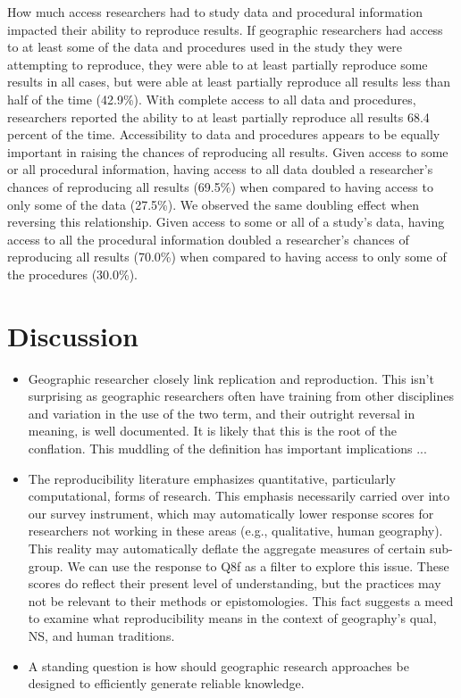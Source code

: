 \documentclass[]{interact}
\theoremstyle{plain}%
\theoremstyle{definition}
\theoremstyle{remark}
\begin{document}
How much access researchers had to study data and procedural information impacted their ability to reproduce results. 
If geographic researchers had access to at least some of the data and procedures used in the study they were attempting to reproduce, they were able to at least partially reproduce some results in all cases, but were able at least partially reproduce all results less than half of the time (42.9\%).
With complete access to all data and procedures, researchers reported the ability to at least partially reproduce all results 68.4 percent of the time.
Accessibility to data and procedures appears to be equally important in raising the chances of reproducing all results. 
Given access to some or all procedural information, having access to all data doubled a researcher's chances of reproducing all results (69.5\%) when compared to having access to only some of the data (27.5\%). 
We observed the same doubling effect when reversing this relationship. 
Given access to some or all of a study's data, having access to all the procedural information doubled a researcher's chances of reproducing all results (70.0\%) when compared to having access to only some of the procedures (30.0\%).


\section*{Discussion}

\begin{itemize}
    \item Geographic researcher closely link replication and reproduction. This isn't surprising as geographic researchers often have training from other disciplines and variation in the use of the two term, and their outright reversal in meaning, is well documented. It is likely that this is the root of the conflation. This muddling of the definition has important implications ...
    \item The reproducibility literature emphasizes quantitative, particularly computational, forms of research. This emphasis necessarily carried over into our survey instrument, which may automatically lower response scores for researchers not working in these areas (e.g., qualitative, human geography). This reality may automatically deflate the aggregate measures of certain sub-group. We can use the response to Q8f as a filter to explore this issue. These scores do reflect their present level of understanding, but the practices may not be relevant to their methods or epistomologies. This fact suggests a meed to examine what reproducibility means in the context of geography's qual, NS, and human traditions.
    \item A standing question is how should geographic research approaches be designed to efficiently generate reliable knowledge.
\end{itemize}
\end{document}
